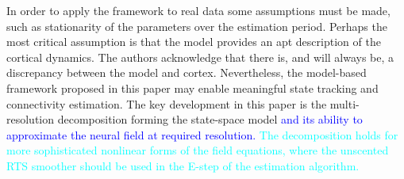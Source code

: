 \documentclass[journal]{IEEEtran}
\newcommand{\parham}[1]{\textcolor{blue}{#1}}
\newcommand{\cut}[1]{\textcolor{cyan}{#1}}
\begin{document}
 In order to apply the framework to real data some assumptions must be made, such as stationarity of the parameters over the estimation period. Perhaps the most critical assumption is that the model provides an apt description of the cortical dynamics. The authors acknowledge that there is, and will always be, a discrepancy between the model and cortex. Nevertheless, the model-based framework proposed in this paper may enable meaningful state tracking and connectivity estimation. The key development in this paper is the multi-resolution decomposition forming the state-space model \parham{and its ability to approximate the neural field at required resolution.} \cut{The decomposition holds for more sophisticated nonlinear forms of the field equations, where the unscented RTS smoother should be used in the E-step of the estimation algorithm.}



\ifCLASSOPTIONcaptionsoff
  \newpage
\fi

%  
% 


 
\end{document}
